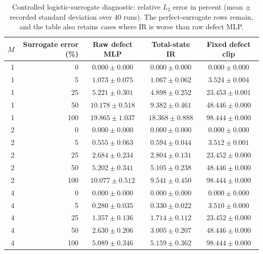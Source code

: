 \begin{table}[htbp]
\centering\small
\caption{Controlled logistic-surrogate diagnostic: relative $L_2$ error in percent (mean $\pm$ recorded standard deviation over 40 runs). The perfect-surrogate rows remain, and the table also retains cases where IR is worse than raw defect MLP.}\label{tab:restored-surrogate}
\begin{tabular}{rrccc}
\toprule
$M$ & Surrogate error (\%) & Raw defect MLP & Total-state IR & Fixed defect clip \\
\midrule
1 & 0 & $0.000\pm0.000$ & $0.000\pm0.000$ & $0.000\pm0.000$ \\
1 & 5 & $1.073\pm0.075$ & $1.067\pm0.062$ & $3.524\pm0.004$ \\
1 & 25 & $5.221\pm0.301$ & $4.898\pm0.252$ & $23.453\pm0.001$ \\
1 & 50 & $10.178\pm0.518$ & $9.382\pm0.461$ & $48.446\pm0.000$ \\
1 & 100 & $19.865\pm1.037$ & $18.368\pm0.888$ & $98.444\pm0.000$ \\
\midrule
2 & 0 & $0.000\pm0.000$ & $0.000\pm0.000$ & $0.000\pm0.000$ \\
2 & 5 & $0.555\pm0.063$ & $0.594\pm0.044$ & $3.512\pm0.001$ \\
2 & 25 & $2.684\pm0.234$ & $2.804\pm0.131$ & $23.452\pm0.000$ \\
2 & 50 & $5.202\pm0.341$ & $5.105\pm0.238$ & $48.446\pm0.000$ \\
2 & 100 & $10.077\pm0.512$ & $9.541\pm0.450$ & $98.444\pm0.000$ \\
\midrule
4 & 0 & $0.000\pm0.000$ & $0.000\pm0.000$ & $0.000\pm0.000$ \\
4 & 5 & $0.280\pm0.035$ & $0.330\pm0.022$ & $3.510\pm0.000$ \\
4 & 25 & $1.357\pm0.136$ & $1.714\pm0.112$ & $23.452\pm0.000$ \\
4 & 50 & $2.630\pm0.206$ & $3.005\pm0.207$ & $48.446\pm0.000$ \\
4 & 100 & $5.089\pm0.346$ & $5.159\pm0.362$ & $98.444\pm0.000$ \\
\bottomrule
\end{tabular}
\end{table}
